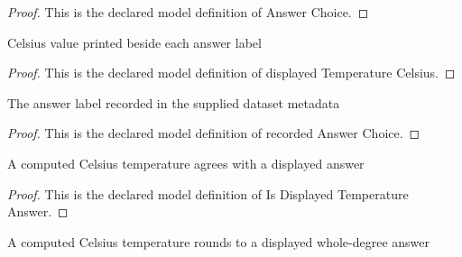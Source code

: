 \begin{proof}
  This is the declared model definition of Answer Choice.
\end{proof}
\begin{definition}
  \label{def:physics:phyx-mini-0371:phyxminiproblems-problemphyxmini0371-displayedtemperaturecelsius}
  Celsius value printed beside each answer label
\end{definition}
\begin{proof}
  This is the declared model definition of displayed Temperature Celsius.
\end{proof}
\begin{definition}
  \label{def:physics:phyx-mini-0371:phyxminiproblems-problemphyxmini0371-recordedanswerchoice}
  The answer label recorded in the supplied dataset metadata
\end{definition}
\begin{proof}
  This is the declared model definition of recorded Answer Choice.
\end{proof}
\begin{definition}
  \label{def:physics:phyx-mini-0371:phyxminiproblems-problemphyxmini0371-isdisplayedtemperatureanswer}
  A computed Celsius temperature agrees with a displayed answer
\end{definition}
\begin{proof}
  This is the declared model definition of Is Displayed Temperature Answer.
\end{proof}
\begin{definition}
  \label{def:physics:phyx-mini-0371:phyxminiproblems-problemphyxmini0371-roundstodisplayedwholedegree}
  A computed Celsius temperature rounds to a displayed whole-degree answer
\end{definition}
